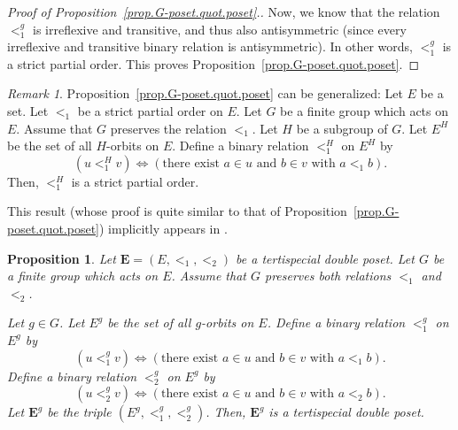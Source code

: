 \documentclass[12pt]{article}
\theoremstyle{plain}
\newtheorem{proposition}[theorem]{Proposition}
\theoremstyle{definition}
\theoremstyle{remark}
\newtheorem{remark}[theorem]{Remark}
\newcommand{\EE}{{\mathbf{E}}}
\begin{document}
\begin{proof}[Proof of Proposition~\ref{prop.G-poset.quot.poset}.]
Now, we know that the relation $<_{1}^{g}$ is irreflexive and transitive, and
thus also antisymmetric (since every irreflexive and transitive binary
relation is antisymmetric). In other words, $<_{1}^{g}$ is a strict partial
order. This proves Proposition~\ref{prop.G-poset.quot.poset}.
\end{proof}

\begin{remark}
Proposition~\ref{prop.G-poset.quot.poset} can be generalized:
Let $E$ be a set. Let $<_1$ be a strict partial order on $E$.
Let $G$ be a finite group which acts on $E$. Assume that $G$ preserves
the relation $<_1$. Let $H$ be a subgroup of $G$.
Let $E^H$ be the set of all $H$-orbits on $E$.
Define a binary relation $<_{1}^H$ on $E^H$ by
\[
\left(  u<_{1}^H v\right)  \Longleftrightarrow\left(  \text{there exist }a\in
u\text{ and }b\in v\text{ with }a<_{1}b\right)  .
\]
Then, $<_1^H$ is a strict partial order.

This result (whose proof is quite similar to that of
Proposition~\ref{prop.G-poset.quot.poset}) implicitly appears in
\cite[p. 30]{Stanley-Peck}.
\end{remark}

\begin{proposition}
\label{prop.G-poset.quot.double}
Let $\EE = \left(E, <_1, <_2\right)$ be a tertispecial double poset.
Let $G$ be a finite group which acts on $E$. Assume that $G$ preserves
both relations $<_1$ and $<_2$.

Let $g \in G$. Let $E^g$ be the set of all $g$-orbits
on $E$. Define a binary relation $<_{1}^{g}$ on $E^{g}$ by
\[
\left(  u<_{1}^{g}v\right)  \Longleftrightarrow\left(  \text{there exist }a\in
u\text{ and }b\in v\text{ with }a<_{1}b\right)  .
\]
Define a binary relation $<_{2}^{g}$ on $E^{g}$ by
\[
\left(  u<_{2}^{g}v\right)  \Longleftrightarrow\left(  \text{there exist }a\in
u\text{ and }b\in v\text{ with }a<_{2}b\right)  .
\]
Let $\EE^g$ be the triple $\left(E^g, <_1^g, <_2^g\right)$. Then,
$\EE^g$ is a tertispecial double poset.
\end{proposition}
\end{document}
